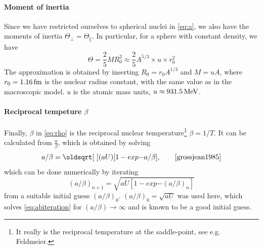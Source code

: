 \paragraph{Moment of inertia}
Since we have restricted ourselves to spherical nuclei in \eqref{eq:a}, we also have the moments of inertia $\Theta_\perp = \Theta_\parallel$. In particular, for a sphere with constant density, we have
\begin{equation}
\Theta = \frac{2}{5} M R_0^2 \approx \frac{2}{5} A^{5/3}\times u \times r_0^2
\end{equation}
The approximation is obtained by inserting $R_0 = r_0 A^{1/3}$ and $M=u A$, where $r_0=\unit[1.16]{fm}$ is the nuclear radius constant, with the same value as in the macroscopic model\cite{moller1995}. $u$ is the atomic mass units, $u \approx \unit[931.5]{MeV}$.
\paragraph{Reciprocal tempeture $\beta$}
Finally, $\beta$ in \eqref{eq:rho} is the reciprocal nuclear temperature\footnote{It really is the reciprocal temperature at the saddle-point, see e.g. Feldmeier\cite{grossjean1985}.} $\beta=1/T$. It can be calculated from $\tfrac{a}{\beta}$, which is obtained by solving
\begin{equation}
a/\beta=\sqrt{(aU)[1 -exp{-a/\beta}]},\qquad\cite{grossjean1985}\label{eq:abiteration}
\end{equation}
which can be done numerically by iterating
\begin{equation}
(a/\beta)_{n+1}=\sqrt{aU[1 -exp{-(a/\beta)_n}]}
\end{equation}
from a suitable initial guess $(a/\beta)_{0}$. $(a/\beta)_{0}=\sqrt{aU}$ was used here, which solves \eqref{eq:abiteration} for $(a/\beta) \to \infty$ and is known to be a good initial guess\cite{grossjean1985}.

\def\bredd{0.5}


